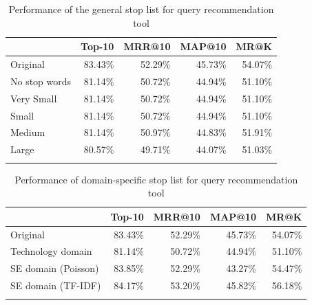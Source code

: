 \documentclass[conference]{IEEEtran}
\begin{document}
\begin{sloppy}
\begin{table}[]
\centering
\caption{Performance of the general stop list for query recommendation tool}
\begin{tabular}{lrrrr}
\toprule
             & Top-10  & MRR@10  & MAP@10  & MR@K    \\
\midrule
Original     & 83.43\% & 52.29\% & 45.73\% & 54.07\% \\
No stop words& \cellcolor{orange}81.14\% & \cellcolor{orange}50.72\% & \cellcolor{orange}44.94\% & \cellcolor{orange}51.10\% \\
Very Small   & \cellcolor{orange}81.14\% & \cellcolor{orange}50.72\% & \cellcolor{orange}44.94\% & \cellcolor{orange}51.10\% \\
Small        & \cellcolor{orange}81.14\% & \cellcolor{orange}50.72\% & \cellcolor{orange}44.94\% & \cellcolor{orange}51.10\% \\
Medium       & \cellcolor{orange}81.14\% & \cellcolor{orange}50.97\% & \cellcolor{orange}44.83\% & \cellcolor{orange}51.91\% \\
Large        & \cellcolor{orange}80.57\% & \cellcolor{orange}49.71\% & \cellcolor{orange}44.07\% & \cellcolor{orange}51.03\% \\
\bottomrule
\label{table:six}
\end{tabular}
\end{table}

\begin{table}[]
\centering
\caption{Performance of domain-specific stop list for query recommendation tool}
\begin{tabular}{lrrrr}
\toprule
                      & Top-10  & MRR@10  & MAP@10  & MR@K    \\
\midrule
Original              & 83.43\% & 52.29\% & 45.73\% & 54.07\% \\
Technology domain     & \cellcolor{orange}81.14\% & \cellcolor{orange}50.72\% & \cellcolor{orange}44.94\% & \cellcolor{orange}51.10\% \\
SE domain  (Poisson) & \cellcolor{green}83.85\% & 52.29\% & \cellcolor{orange}43.27\% & \cellcolor{green}54.47\% \\
SE domain (TF-IDF)    & \cellcolor{green}84.17\% & \cellcolor{green}53.20\% & \cellcolor{green}45.82\% & \cellcolor{green}56.18\% \\
\bottomrule
\label{table:seven}
\end{tabular}
\end{table}


\end{sloppy}
\end{document}

